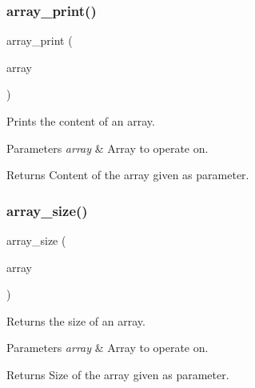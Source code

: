\subsubsection{\texorpdfstring{array\+\_\+print()}{array\_print()}}
{\footnotesize\ttfamily array\+\_\+print (\begin{DoxyParamCaption}\item[{array}]{ }\end{DoxyParamCaption})}



Prints the content of an array. 


\begin{DoxyParams}{Parameters}
{\em array} & Array to operate on. \\
\hline
\end{DoxyParams}
\begin{DoxyReturn}{Returns}
Content of the array given as parameter. 
\end{DoxyReturn}
\mbox{\label{group__array_ga06f72437a7b990eca354502b6c628bb9}} 
\subsubsection{\texorpdfstring{array\+\_\+size()}{array\_size()}}
{\footnotesize\ttfamily array\+\_\+size (\begin{DoxyParamCaption}\item[{array}]{ }\end{DoxyParamCaption})}



Returns the size of an array. 


\begin{DoxyParams}{Parameters}
{\em array} & Array to operate on. \\
\hline
\end{DoxyParams}
\begin{DoxyReturn}{Returns}
Size of the array given as parameter. 
\end{DoxyReturn}
